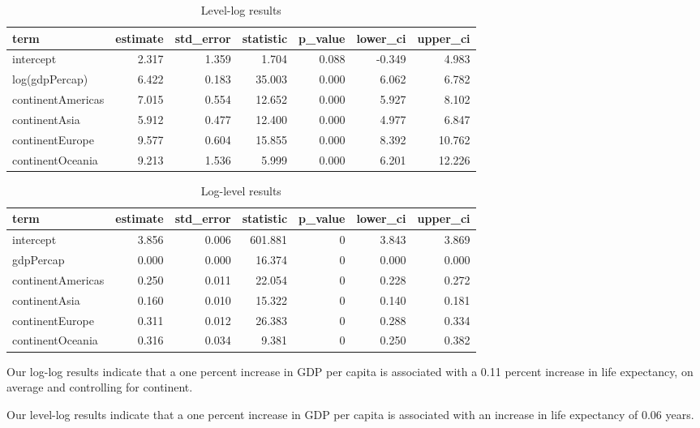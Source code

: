 \documentclass[
]{book}
\begin{document}
\begin{table}

\caption{\label{tab:levlogtab}Level-log results}
\centering
\begin{tabular}[t]{l|r|r|r|r|r|r}
\hline
term & estimate & std\_error & statistic & p\_value & lower\_ci & upper\_ci\\
\hline
intercept & 2.317 & 1.359 & 1.704 & 0.088 & -0.349 & 4.983\\
\hline
log(gdpPercap) & 6.422 & 0.183 & 35.003 & 0.000 & 6.062 & 6.782\\
\hline
continentAmericas & 7.015 & 0.554 & 12.652 & 0.000 & 5.927 & 8.102\\
\hline
continentAsia & 5.912 & 0.477 & 12.400 & 0.000 & 4.977 & 6.847\\
\hline
continentEurope & 9.577 & 0.604 & 15.855 & 0.000 & 8.392 & 10.762\\
\hline
continentOceania & 9.213 & 1.536 & 5.999 & 0.000 & 6.201 & 12.226\\
\hline
\end{tabular}
\end{table}

\begin{table}

\caption{\label{tab:loglevtab}Log-level results}
\centering
\begin{tabular}[t]{l|r|r|r|r|r|r}
\hline
term & estimate & std\_error & statistic & p\_value & lower\_ci & upper\_ci\\
\hline
intercept & 3.856 & 0.006 & 601.881 & 0 & 3.843 & 3.869\\
\hline
gdpPercap & 0.000 & 0.000 & 16.374 & 0 & 0.000 & 0.000\\
\hline
continentAmericas & 0.250 & 0.011 & 22.054 & 0 & 0.228 & 0.272\\
\hline
continentAsia & 0.160 & 0.010 & 15.322 & 0 & 0.140 & 0.181\\
\hline
continentEurope & 0.311 & 0.012 & 26.383 & 0 & 0.288 & 0.334\\
\hline
continentOceania & 0.316 & 0.034 & 9.381 & 0 & 0.250 & 0.382\\
\hline
\end{tabular}
\end{table}

Our log-log results indicate that a one percent increase in GDP per capita is associated with a 0.11 percent increase in life expectancy, on average and controlling for continent.

Our level-log results indicate that a one percent increase in GDP per capita is associated with an increase in life expectancy of 0.06 years.
\end{document}
